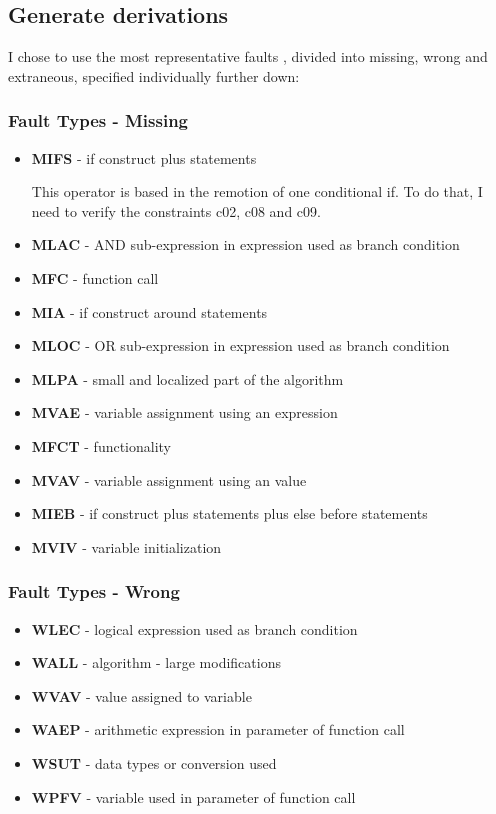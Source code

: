 \subsection{Generate derivations}

I chose to use the most representative faults \cite{duraes2006emulation}, divided into missing, wrong and extraneous, specified individually further down:


\subsubsection{Fault Types - Missing}
\begin{itemize}
	\item \textbf{MIFS} - if construct plus statements

	This operator is based in the remotion of one conditional if. To do that, I need to verify the constraints c02, c08 and c09.
	\item \textbf{MLAC} - AND sub-expression in expression used as branch condition
	\item \textbf{MFC}  - function call
	\item \textbf{MIA}  - if construct around statements
	\item \textbf{MLOC} - OR sub-expression in expression used as branch condition
	\item \textbf{MLPA} - small and localized part of the algorithm
	\item \textbf{MVAE} - variable assignment using an expression
	\item \textbf{MFCT} - functionality
	\item \textbf{MVAV} - variable assignment using an value
	\item \textbf{MIEB} - if construct plus statements plus else before statements
	\item \textbf{MVIV} - variable initialization
\end{itemize}

\subsubsection{Fault Types - Wrong}
\begin{itemize}
	\item \textbf{WLEC} - logical expression used as branch condition
	\item \textbf{WALL} - algorithm - large modifications
	\item \textbf{WVAV} - value assigned to variable
	\item \textbf{WAEP} - arithmetic expression in parameter of function call
	\item \textbf{WSUT} - data types or conversion used
	\item \textbf{WPFV} - variable used in parameter of function call
\end{itemize}

